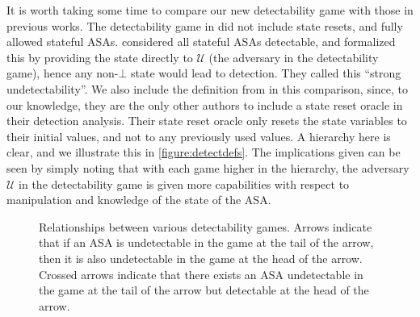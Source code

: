 It is worth taking some time to compare our new detectability game with those in previous works. The detectability game in \cite{C:BelPatRog14} did not include state resets, and fully allowed stateful ASAs. \cite{CCS:BelJaeKan15} considered all stateful ASAs detectable, and formalized this by providing the state directly to $\mathcal{U}$ (the adversary in the detectability game), hence any non-$\bot$ state would lead to detection. They called this ``strong undetectability''. We also include the definition from \cite{BSKC2019} in this comparison, since, to our knowledge, they are the only other authors to include a state reset oracle in their detection analysis. Their state reset oracle only resets the state variables to their initial values, and not to any previously used values. A hierarchy here is clear, and we illustrate this in \autoref{figure:detectdefs}. The implications given can be seen by simply noting that with each game higher in the hierarchy, the adversary $\mathcal{U}$ in the detectability game is given more capabilities with respect to manipulation and knowledge of the state of the ASA.

\begin{figure}
\centering
{}
\caption[Relationships between detectability definitions in several works]{Relationships between various detectability games. Arrows indicate that if an ASA is undetectable in the game at the tail of the arrow, then it is also undetectable in the game at the head of the arrow. Crossed arrows indicate that there exists an ASA undetectable in the game at the tail of the arrow but detectable at the head of the arrow.}
\label{figure:detectdefs}
\end{figure}

